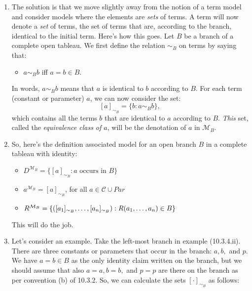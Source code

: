 \begin{enumerate}[\thesection.1]
	\item The solution is that we move slightly away from the notion of a term model and consider models where the elements are \emph{sets} of terms. A term will now denote a \emph{set} of terms, the set of terms that are, according to the branch, identical to the initial term. Here's how this goes. Let $B$ be a branch of a complete open tableau. We first define the relation $\sim_B$ on terms by saying that:
	
	\begin{itemize}

		\item $a\sim_B b$ iff $a=b\in B$.
	
	\end{itemize}
In words, $a\sim_B b$ means that $a$ is identical to $b$ according to $B$. For each term (constant or parameter) $a$, we can now consider the set: \[[a]_{\sim_B}=\{b:a\sim_Bb\},\] which contains all the terms $b$ that are identical to $a$ according to $B$. \emph{This} set, called the \emph{equivalence class of $a$},  will be the denotation of $a$ in $\mathcal{M}_B$. 

	\item So, here's the definition associated model for an open branch $B$ in a complete tableau with identity:

		\begin{itemize}
		
			\item $D^{\mathcal{M}_B}=\{[a]_{\sim_B}:a\text{ occurs in }B\}$
			
			\item $a^{\mathcal{M}_B}=[a]_{\sim_B}$, for all $a\in \mathcal{C}\cup Par$
			
			\item $R^{\mathcal{M}_B}=\{([a_1]_{\sim_B}, \mathellipsis, [a_n]_{\sim_B}): R(a_1, \mathellipsis, a_n)\in B\}$

		\end{itemize}
		This will do the job. 
		
	\item Let's consider an example. Take the left-most branch in example (10.3.4.ii). There are three constants or parameters that occur in the branch: $a,b,$ and $p$. We have $a=b\in B$ as the only identity claim written on the branch, but we should assume that also $a=a, b=b,$ and $p=p$ are there on the branch as per convention (b) of 10.3.2. So, we can calculate the sets $[\cdot ]_{\sim_B}$ as follows:
	\begin{itemize}
	

\end{itemize}
\end{enumerate}
